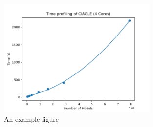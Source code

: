 \documentclass[12pt]{article}
\begin{document}
            \begin{figure}[H] %
                \centering
                \includegraphics[width=0.7\textwidth]{figures/profiling_time.png}
                \caption{An example figure}
                \label{fig:Profiling}
            \end{figure}
            
    

\newpage

\appendix
\end{document}
